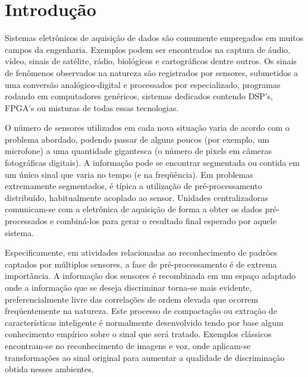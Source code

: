\typeout{ ====================================================================}
\typeout{ ====================================================================}

\chapter{Introdução}

Sistemas eletrônicos de aquisição de dados são comumente empregados em muitos
campos da engenharia. Exemplos podem ser encontrados na captura de áudio,
vídeo, sinais de satélite, rádio, biológicos e cartográficos dentre outros. Os
sinais de fenômenos observados na natureza são registrados por sensores,
submetidos a uma conversão analógico-digital e processados por 
especializado, programas rodando em computadores genéricos, sistemas dedicados
contendo DSP's, FPGA's ou misturas de todas essas tecnologias.

O número de sensores utilizados em cada nova situação varia de acordo com o
problema abordado, podendo passar de alguns poucos (por exemplo, um microfone)
a uma quantidade gigantesca (o número de pixels em câmeras fotográficas
digitais). A informação pode se encontrar segmentada ou contida em um único
sinal que varia no tempo (e na freqüência). Em problemas extremamente
segmentados, é típica a utilização de pré-processamento distribuído,
habitualmente acoplado ao sensor. Unidades centralizadoras comunicam-se com a
eletrônica de aquisição de forma a obter os dados pré-processados e
combiná-los para gerar o resultado final esperado por aquele sistema.

Especificamente, em atividades relacionadas ao reconhecimento de padrões
captados por múltiplos sensores, a fase de pré-processamento é de extrema
importância. A informação dos sensores é recombinada em um espaço adaptado
onde a informação que se deseja discriminar torna-se mais evidente,
preferencialmente livre das correlações de ordem elevada que ocorrem
freqüentemente na natureza. Este processo de compactação ou extração de
características inteligente é normalmente desenvolvido tendo por base algum
conhecimento empírico sobre o sinal que será tratado. Exemplos clássicos
encontram-se no reconhecimento de imagens e voz, onde aplicam-se
transformações ao sinal original para aumentar a qualidade de discriminação
obtida nesses ambientes.


